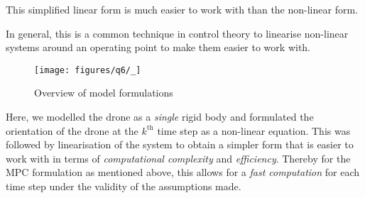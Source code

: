 This simplified linear form is much easier to work with than the non-linear form.

\clearpage
In general, this is a common technique in control theory to linearise non-linear systems around an operating point to make them easier to work with.

\begin{figure}[htbp]
    \centering
    \texttt{[image: figures/q6/\_]}
    \caption{
        Overview of model formulations
    }\label{fig:q6-flowchart}
\end{figure}

Here, we modelled the drone as a \textit{single} rigid body and formulated the orientation of the drone at the \( k^{\text{th}} \) time step as a non-linear equation.
This was followed by linearisation of the system to obtain a simpler form that is easier to work with in terms of \textit{computational complexity} and \textit{efficiency}.
Thereby for the MPC formulation as mentioned above, this allows for a \textit{fast computation} for each time step under the validity of the assumptions made.
